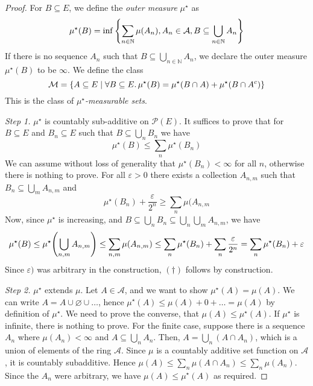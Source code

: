 \begin{proof}
	For \( B \subseteq E \), we define the \emph{outer measure} \( \mu^\star \) as
	\[ \mu^\star(B) = \inf \qty{\sum_{n \in \mathbb N} \mu(A_n), A_n \in \mathcal A, B \subseteq \bigcup_{n \in \mathbb N} A_n} \]
	If there is no sequence \( A_n \) such that \( B \subseteq \bigcup_{n \in \mathbb N} A_n \), we declare the outer measure \( \mu^\star(B) \) to be \( \infty \).
	We define the class
	\[ \mathcal M = \qty{A \subseteq E \mid \forall B \subseteq E.\,\mu^\star(B) = \mu^\star(B \cap A) + \mu^\star(B \cap A^c)} \]
	This is the class of \emph{\( \mu^\star \)-measurable sets}.

	\emph{Step 1.} \( \mu^\star \) is countably sub-additive on \( \mathcal P(E) \).
	It suffices to prove that for \( B \subseteq E \) and \( B_n \subseteq E \) such that \( B \subseteq \bigcup_n B_n \) we have
	\begin{equation}
		\mu^\star(B) \leq \sum_n \mu^\star(B_n)
		\tag{\(\dagger\)}
	\end{equation}
	We can assume without loss of generality that \( \mu^\star(B_n) < \infty \) for all \( n \), otherwise there is nothing to prove.
	For all \( \varepsilon > 0 \) there exists a collection \( A_{n,m} \) such that \( B_n \subseteq \bigcup_m A_{n,m} \) and
	\[ \mu^\star(B_n) + \frac{\varepsilon}{2^n} \geq \sum_n \mu(A_{n,m} \]
	Now, since \( \mu^\star \) is increasing, and \( B \subseteq \bigcup_n B_n \subseteq \bigcup_n \bigcup_m A_{n,m} \), we have
	\[ \mu^\star(B) \leq \mu^\star\qty(\bigcup_{n,m} A_{n,m}) \leq \sum_{n,m} \mu(A_{n,m}) \leq \sum_n \mu^\star(B_n) + \sum_n \frac{\varepsilon}{2^n} = \sum_n \mu^\star(B_n) + \varepsilon \]
	Since \( \varepsilon) \) was arbitrary in the construction, \( (\dagger) \) follows by construction.

	\emph{Step 2.} \( \mu^\star \) extends \( \mu \).
	Let \( A \in \mathcal A \), and we want to show \( \mu^\star(A) = \mu(A) \).
	We can write \( A = A \cup \varnothing \cup \dots \), hence \( \mu^\star(A) \leq \mu(A) + 0 + \dots = \mu(A) \) by definition of \( \mu^\star \).
	We need to prove the converse, that \( \mu(A) \leq \mu^\star(A) \).
	If \( \mu^\star \) is infinite, there is nothing to prove.
	For the finite case, suppose there is a sequence \( A_n \) where \( \mu(A_n) < \infty \) and \( A \subseteq \bigcup_n A_n \).
	Then, \( A = \bigcup_n (A \cap A_n) \), which is a union of elements of the ring \( \mathcal A \).
	Since \( \mu \) is a countably additive set function on \( \mathcal A \), it is countably subadditive.
	Hence \( \mu(A) \leq \sum_n \mu(A \cap A_n) \leq \sum_n \mu(A_n) \).
	Since the \( A_n \) were arbitrary, we have \( \mu(A) \leq \mu^\star(A) \) as required.


\end{proof}
